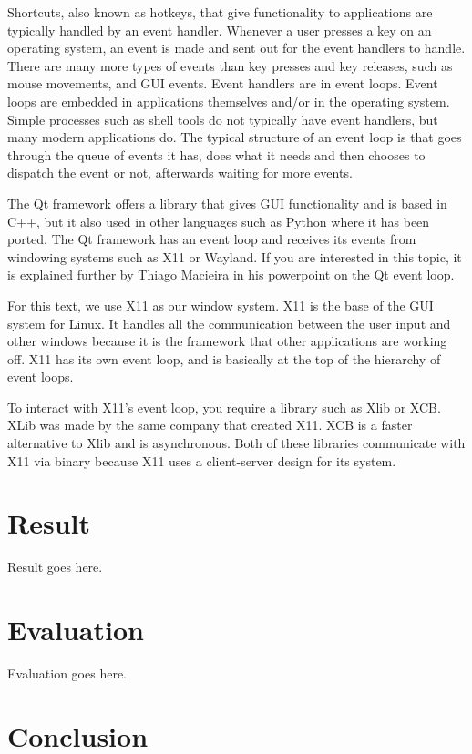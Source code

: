 \documentclass[12pt]{article}
\begin{document}
	
Shortcuts, also known as hotkeys, that give functionality to applications are typically handled by an event handler.
Whenever a user presses a key on an operating system, an event is made and sent out for the event handlers to handle.
There are many more types of events than key presses and key releases, such as mouse movements, and GUI events.
Event handlers are in event loops. Event loops are embedded in applications themselves and/or in the operating system. Simple processes such as shell tools do not typically have event handlers, but many modern applications do. The typical structure of an event loop is that goes through the queue of events it has, does what it needs and then chooses to dispatch the event or not, afterwards waiting for more events. 

The Qt framework offers a library that gives GUI functionality and is based in C++, but it also used in other languages such as Python where it has been ported.
The Qt framework has an event loop and receives its events from windowing systems such as X11 or Wayland.
If you are interested in this topic, it is explained further by Thiago Macieira in his powerpoint on the Qt event loop\cite{QtSlides}.

For this text, we use X11 as our window system.
X11 is the base of the GUI system for Linux.
It handles all the communication between the user input and other windows because it is the framework that other applications are working off.
X11 has its own event loop, and is basically at the top of the hierarchy of event loops.

To interact with X11's event loop, you require a library such as Xlib or XCB.
XLib was made by the same company that created X11.
XCB is a faster alternative to Xlib and is asynchronous.
Both of these libraries communicate with X11 via binary because X11 uses a client-server design for its system.


	
	\section{Result}
	Result goes here.
	
	\section{Evaluation}
	Evaluation goes here.
	
	\section{Conclusion}
	
\end{document}
